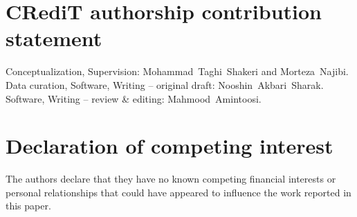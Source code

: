 \documentclass{article}
\begin{document}
\section{CRediT authorship contribution statement}

Conceptualization, Supervision: Mohammad~Taghi~Shakeri and Morteza~Najibi.
Data curation, Software, Writing -- original draft: Nooshin~Akbari~Sharak.
Software, Writing -- review \& editing: Mahmood~Amintoosi.

\section{Declaration of competing interest}

The authors declare that they have no known competing financial interests or personal relationships that could have appeared to influence the work reported in this paper.



\end{document}
